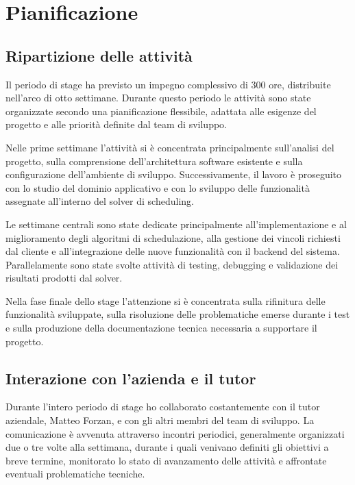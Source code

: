 \section{Pianificazione}
\label{sec:pianificazione-stage}

\subsection{Ripartizione delle attività}

Il periodo di stage ha previsto un impegno complessivo di 300 ore, distribuite nell'arco di otto settimane. Durante questo periodo le attività sono state organizzate secondo una pianificazione flessibile, adattata alle esigenze del progetto e alle priorità definite dal team di sviluppo.

Nelle prime settimane l'attività si è concentrata principalmente sull'analisi del progetto, sulla comprensione dell'architettura software esistente e sulla configurazione dell'ambiente di sviluppo. Successivamente, il lavoro è proseguito con lo studio del dominio applicativo e con lo sviluppo delle funzionalità assegnate all'interno del solver di scheduling.

Le settimane centrali sono state dedicate principalmente all'implementazione e al miglioramento degli algoritmi di schedulazione, alla gestione dei vincoli richiesti dal cliente e all'integrazione delle nuove funzionalità con il backend del sistema. Parallelamente sono state svolte attività di testing, debugging e validazione dei risultati prodotti dal solver.

Nella fase finale dello stage l'attenzione si è concentrata sulla rifinitura delle funzionalità sviluppate, sulla risoluzione delle problematiche emerse durante i test e sulla produzione della documentazione tecnica necessaria a supportare il progetto.

\subsection{Interazione con l'azienda e il tutor}

Durante l'intero periodo di stage ho collaborato costantemente con il tutor aziendale, Matteo Forzan, e con gli altri membri del team di sviluppo. La comunicazione è avvenuta attraverso incontri periodici, generalmente organizzati due o tre volte alla settimana, durante i quali venivano definiti gli obiettivi a breve termine, monitorato lo stato di avanzamento delle attività e affrontate eventuali problematiche tecniche.

